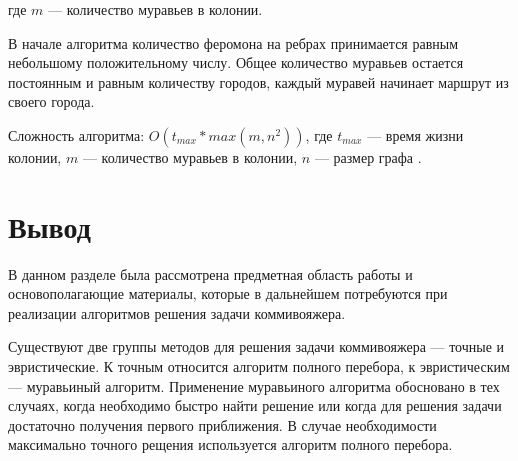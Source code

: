 \noindent где $m$ — количество муравьев в колонии.


В начале алгоритма количество феромона на ребрах принимается равным небольшому положительному числу. Общее количество муравьев остается постоянным и равным количеству городов, каждый муравей начинает маршрут из своего города. 


Сложность алгоритма: $O(t_{max} * max(m, n^2))$, где $t_{max}$ --- время жизни колонии, $m$ --- количество муравьев в колонии, $n$ --- размер графа \cite{Ulyanov}.

\section*{Вывод}

В данном разделе была рассмотрена предметная область работы и основополагающие материалы, которые в дальнейшем потребуются при реализации алгоритмов решения задачи коммивояжера.


Существуют две группы методов для решения задачи коммивояжера — точные и эвристические. К точным относится алгоритм полного перебора, к эвристическим — муравьиный алгоритм. Применение муравьиного алгоритма обосновано в тех случаях, когда необходимо быстро найти решение или когда для решения задачи достаточно получения первого приближения. В случае необходимости максимально точного рещения используется алгоритм полного перебора.
